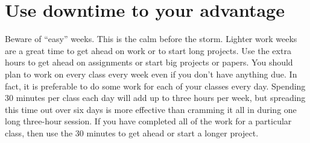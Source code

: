 \documentclass[../main.tex]{subfiles}
\begin{document}
\section{Use downtime to your advantage}
Beware of ``easy'' weeks. This is the calm before the storm. Lighter work weeks
are a great time to get ahead on work or to start long projects. Use the extra
hours to get ahead on assignments or start big projects or papers. You should
plan to work on every class every week even if you don't have anything due. In
fact, it is preferable to do some work for each of your classes every day.
Spending 30 minutes per class each day will add up to three hours per week, but
spreading this time out over six days is more effective than cramming it all in
during one long three-hour session. If you have completed all of the work for a
particular class, then use the 30 minutes to get ahead or start a longer
project.
%
\end{document}
